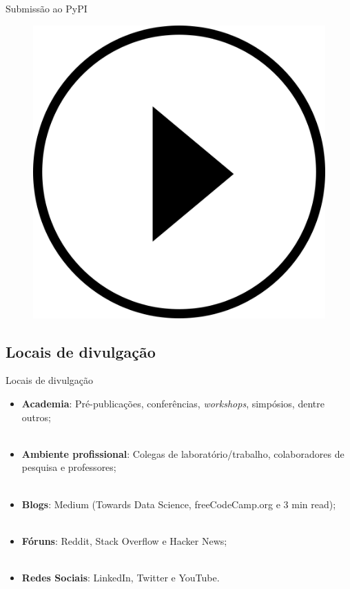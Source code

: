 \begin{frame}{Submissão ao PyPI}
	\begin{figure}
		\centering
		\includegraphics[scale=0.125]{figs/video_play.png}
	\end{figure}
\end{frame}

\subsection{Locais de divulgação}
\label{ss.places_sharing}

\begin{frame}{Locais de divulgação}
	\justify
	\begin{itemize}
		\item \textbf{Academia}: Pré-publicações, conferências, \emph{workshops}, simpósios, dentre outros;
		\\~\\
		\item \textbf{Ambiente profissional}: Colegas de laboratório/trabalho, colaboradores de pesquisa e professores;
		\\~\\
		\item \textbf{Blogs}: Medium (Towards Data Science, freeCodeCamp.org e 3 min read);
		\\~\\
		\item \textbf{Fóruns}: Reddit, Stack Overflow e Hacker News;
		\\~\\
		\item \textbf{Redes Sociais}: LinkedIn, Twitter e YouTube.
	\end{itemize}
\end{frame}